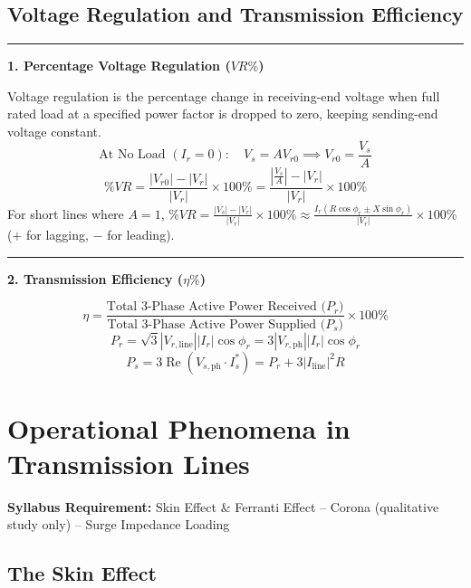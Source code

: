 \documentclass[11pt,a4paper]{article}
\newcommand{\concept}[1]{%
  \vspace{3pt}\noindent\textcolor{AnthGreen}{\rule{3.5pt}{10pt}}\enspace
  \textbf{\sffamily\color{AnthDark}#1}\par\vspace{2pt}%
}
\newcommand{\syllabusitem}[1]{%
  \begin{tcolorbox}[enhanced, colback=AnthOrange!8, colframe=AnthOrange, boxrule=0.4pt, arc=3pt, left=7pt, right=7pt, top=3pt, bottom=3pt]
    \small\sffamily\textbf{\color{AnthOrange}Syllabus Requirement:} #1
  \end{tcolorbox}
}
\begin{document}
\subsection{Voltage Regulation and Transmission Efficiency}

\concept{1. Percentage Voltage Regulation ($VR\%$)}
Voltage regulation is the percentage change in receiving-end voltage when full rated load at a specified power factor is dropped to zero, keeping sending-end voltage constant.
\begin{equation}
  \text{At No Load } (I_r = 0): \quad V_s = A V_{r0} \implies V_{r0} = \frac{V_s}{A}
\end{equation}
\begin{equation}
  \% VR = \frac{|V_{r0}| - |V_r|}{|V_r|} \times 100\% = \frac{\left|\frac{V_s}{A}\right| - |V_r|}{|V_r|} \times 100\%
\end{equation}
For short lines where $A=1$, $\% VR = \frac{|V_s| - |V_r|}{|V_r|} \times 100\% \approx \frac{I_r (R \cos\phi_r \pm X \sin\phi_r)}{|V_r|} \times 100\%$ ($+$ for lagging, $-$ for leading).

\concept{2. Transmission Efficiency ($\eta\%$)}
\begin{equation}
  \eta = \frac{\text{Total 3-Phase Active Power Received ($P_r$)}}{\text{Total 3-Phase Active Power Supplied ($P_s$)}} \times 100\%
\end{equation}
\begin{equation}
  P_r = \sqrt{3} |V_{r,\text{line}}| |I_r| \cos\phi_r = 3 |V_{r,\text{ph}}| |I_r| \cos\phi_r
\end{equation}
\begin{equation}
  P_s = 3 \operatorname{Re}\left( V_{s,\text{ph}} \cdot I_s^* \right) = P_r + 3 |I_{\text{line}}|^2 R
\end{equation}

\clearpage
\section{Operational Phenomena in Transmission Lines}

\syllabusitem{Skin Effect \& Ferranti Effect – Corona (qualitative study only) – Surge Impedance Loading}

\subsection{The Skin Effect}
\end{document}
